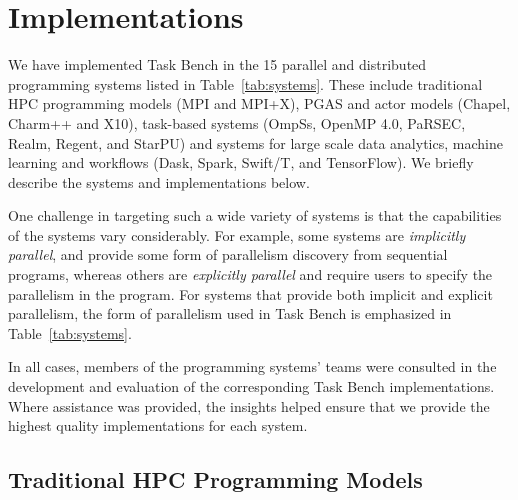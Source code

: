 \section{Implementations}
\label{sec:implementation}

We have implemented Task Bench in the 15 parallel and distributed
programming systems listed in Table~\ref{tab:systems}. These include
traditional HPC programming models (MPI and MPI+X), PGAS and actor
models (Chapel, Charm++ and X10), task-based systems (OmpSs, OpenMP
4.0, PaRSEC, Realm, Regent, and StarPU) and systems for large scale
data analytics, machine learning and workflows (Dask, Spark, Swift/T,
and TensorFlow). We briefly describe the systems and implementations
below.

One challenge in targeting such a wide variety of
systems is that the capabilities of the systems vary considerably. For
example, some systems are \emph{implicitly parallel}, and provide some
form of parallelism discovery from sequential programs, whereas others
are \emph{explicitly parallel} and require users to specify the
parallelism in the program. For systems that provide both implicit and explicit parallelism, the form of parallelism used in Task Bench is emphasized in Table~\ref{tab:systems}.



In all cases, members of the programming systems' teams
were consulted in the development and evaluation of the
corresponding Task Bench implementations. Where assistance was provided, the insights helped ensure that we provide the highest quality implementations for each system.

\subsection{Traditional HPC Programming Models}


